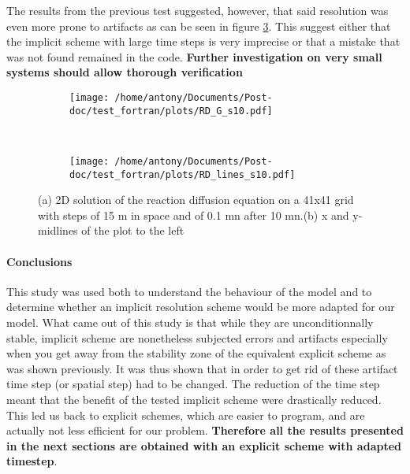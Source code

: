 \documentclass[11pt,a4paper]{article}
\begin{document}
The results from the previous test suggested, however, that said resolution was even more prone to artifacts as can be seen in figure \ref{RD_s10}. This suggest either that the implicit scheme with large time steps is very imprecise or that a mistake that was not found remained in the code. \textbf{Further investigation on very small systems should allow thorough verification}

\begin{figure}[ht!]
	\begin{subfigure}{0.45\textwidth}
	\centering
	\texttt{[image: /home/antony/Documents/Post-doc/test\_fortran/plots/RD\_G\_s10.pdf]}
	\caption{ \label{RD_G_s10}}
	\end{subfigure}
	~~
	\begin{subfigure}{0.45\textwidth}
	\texttt{[image: /home/antony/Documents/Post-doc/test\_fortran/plots/RD\_lines\_s10.pdf]}
		\caption{ \label{RD_lines_s10}}
	\end{subfigure}
	\caption{(a) 2D solution of the reaction diffusion equation on a 41x41 grid with steps of 15 \textmu m in space and of 0.1 mn after 10 mn.(b) x and y-midlines of the plot to the left \label{RD_s10}}
\end{figure}

\paragraph{Conclusions}
This study was used both to understand the behaviour of the model and to determine whether an implicit resolution scheme would be more adapted for our model. What came out of this study is that while they are unconditionnally stable, implicit scheme are nonetheless subjected errors and artifacts especially when you get away from the stability zone of the equivalent explicit scheme as was shown previously. It was thus shown that in order to  get rid of these artifact time step (or spatial step) had to be changed. The reduction of the time step meant that the benefit of the tested implicit scheme were drastically reduced. This led us back to explicit schemes, which are easier to program, and are actually not less efficient for our problem. \textbf{Therefore all the results presented in the next sections are obtained with an explicit scheme with adapted timestep}. 
\end{document}
